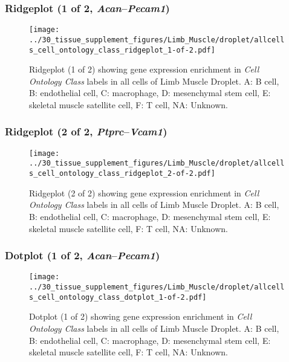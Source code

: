 \clearpage

\subsubsection{Ridgeplot (1 of 2, \emph{Acan}--\emph{Pecam1})}
\begin{figure}[h]
\centering
\texttt{[image: ../30\_tissue\_supplement\_figures/Limb\_Muscle/droplet/allcells\_cell\_ontology\_class\_ridgeplot\_1-of-2.pdf]}

\caption{ Ridgeplot (1 of 2)  showing gene expression enrichment in \emph{Cell Ontology Class} labels in all cells of Limb Muscle Droplet. A: B cell, B: endothelial cell, C: macrophage, D: mesenchymal stem cell, E: skeletal muscle satellite cell, F: T cell, NA: Unknown.}
\end{figure}


\clearpage

\subsubsection{Ridgeplot (2 of 2, \emph{Ptprc}--\emph{Vcam1})}
\begin{figure}[h]
\centering
\texttt{[image: ../30\_tissue\_supplement\_figures/Limb\_Muscle/droplet/allcells\_cell\_ontology\_class\_ridgeplot\_2-of-2.pdf]}

\caption{ Ridgeplot (2 of 2)  showing gene expression enrichment in \emph{Cell Ontology Class} labels in all cells of Limb Muscle Droplet. A: B cell, B: endothelial cell, C: macrophage, D: mesenchymal stem cell, E: skeletal muscle satellite cell, F: T cell, NA: Unknown.}
\end{figure}


\clearpage

\subsubsection{Dotplot (1 of 2, \emph{Acan}--\emph{Pecam1})}
\begin{figure}[h]
\centering
\texttt{[image: ../30\_tissue\_supplement\_figures/Limb\_Muscle/droplet/allcells\_cell\_ontology\_class\_dotplot\_1-of-2.pdf]}

\caption{ Dotplot (1 of 2)  showing gene expression enrichment in \emph{Cell Ontology Class} labels in all cells of Limb Muscle Droplet. A: B cell, B: endothelial cell, C: macrophage, D: mesenchymal stem cell, E: skeletal muscle satellite cell, F: T cell, NA: Unknown.}
\end{figure}


